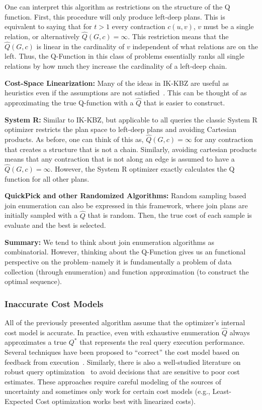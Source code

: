 One can interpret this algorithm as restrictions on the structure of the Q function. First, this procedure will only produce left-deep plans. This is equivalent to saying that for $t>1$ every contraction $c(u,v)$, $v$ must be a single relation, or alternatively $\hat{Q}(G,c) = \infty$. This restriction means that the $\hat{Q}(G,c)$ is linear in the cardinality of $v$ independent of what relations are on the left. Thus, the Q-Function in this class of problems essentially ranks all single relations by how much they increase the cardinality of a left-deep chain. 

\vspace{0.25em} \noindent \textbf{Cost-Space Linearization: } Many of the ideas in IK-KBZ are useful as heuristics even if the assumptions are not satisfied~\cite{?}. This can be thought of as approximating the true Q-function with a $\hat{Q}$ that is easier to construct.

\vspace{0.25em} \noindent \textbf{System R: } Similar to IK-KBZ, but applicable to all queries the classic System R optimizer restricts the plan space to left-deep plans and avoiding Cartesian products. As before, one can think of this as, $\hat{Q}(G, c) = \infty$ for any contraction that creates a structure that is not a chain. Similarly, avoiding cartesian products means that any contraction that is not along an edge is assumed to have a $\hat{Q}(G,c) = \infty$. However, the System R optimizer exactly calculates the Q function for all other plans.

\vspace{0.25em} \noindent \textbf{QuickPick and other Randomized Algorithms: } Random sampling based join enumeration can also be expressed in this framework, where join plans are initially sampled with a $\hat{Q}$ that is random. Then, the true cost of each sample is evaluate and the best is selected. 

\vspace{0.25em} \noindent \textbf{Summary: } We tend to think about join enumeration algorithms as combinatorial. However, thinking about the Q-Function gives us an functional perspective on the problem--namely it is fundamentally a problem of data collection (through enumeration) and function approximation (to construct the optimal sequence).  

\subsubsection{Inaccurate Cost Models}
All of the previously presented algorithm assume that the optimizer's internal cost model is accurate. In practice, even with exhaustive enumeration $\hat{Q}$ always approximates a true $Q^*$ that represents the real query execution performance. Several techniques have been proposed to ``correct'' the cost model based on feedback from execution~\cite{?}. Similarly, there is also a well-studied literature on robust query optimization~\cite{?} to avoid decisions that are sensitive to poor cost estimates. These approaches require careful modeling of the sources of uncertainty and sometimes only work for certain cost models (e.g., Least-Expected Cost optimization works best with linearized costs). 

